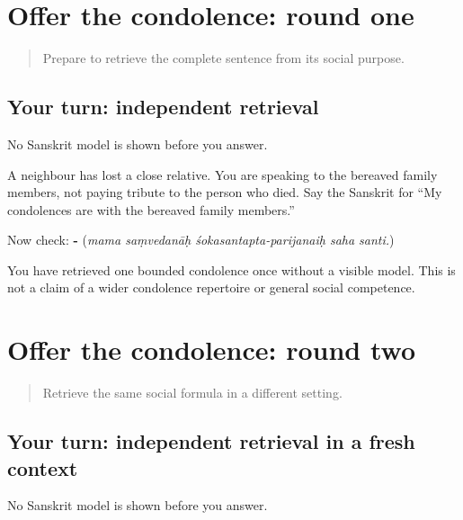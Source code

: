 \section[(independent condolence retrieval …]{Offer the condolence: round one}

\label{lesson:SA-C272-condolence-first-retrieval}



\begin{quote}
Prepare to retrieve the complete sentence from its social purpose.
\end{quote}

\subsection*{Your turn: independent retrieval}
No Sanskrit model is shown before you answer.

A neighbour has lost a close relative. You are speaking to the bereaved family members, not paying tribute to the person who died. Say the Sanskrit for “My condolences are with the bereaved family members.”

\begin{grammarlens}[title={What you've built: check after answering}]
Now check: \textbf{  -  } (\emph{mama saṃvedanāḥ śokasantapta-parijanaiḥ saha santi.})
\end{grammarlens}

\begin{tcolorbox}[breakable,colback=teal!4,colframe=teal!35!black,title={Before you move on}]
You have retrieved one bounded condolence once without a visible model. This is not a claim of a wider condolence repertoire or general social competence.
\end{tcolorbox}
\section[(independent condolence retrieval …]{Offer the condolence: round two}

\label{lesson:SA-C272-condolence-final-retrieval}



\begin{quote}
Retrieve the same social formula in a different setting.
\end{quote}

\subsection*{Your turn: independent retrieval in a fresh context}
No Sanskrit model is shown before you answer.


